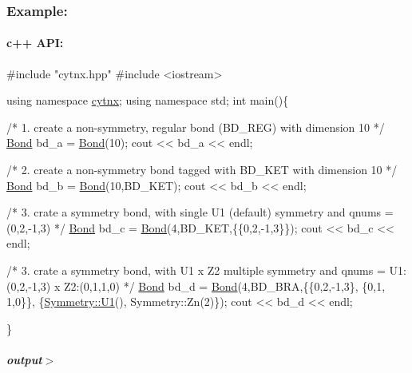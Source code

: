 \subsubsection*{Example\+:}

\paragraph*{c++ A\+PI\+:}


\begin{DoxyCodeInclude}
\textcolor{preprocessor}{#include "cytnx.hpp"}
\textcolor{preprocessor}{#include <iostream>}


\textcolor{keyword}{using namespace }\hyperlink{namespacecytnx}{cytnx};
\textcolor{keyword}{using namespace }std;
\textcolor{keywordtype}{int} main()\{ 

    \textcolor{comment}{/* 1.}
\textcolor{comment}{        create a non-symmetry, regular bond (BD\_REG) }
\textcolor{comment}{        with dimension 10}
\textcolor{comment}{    */}
    \hyperlink{classcytnx_1_1Bond}{Bond} bd\_a = \hyperlink{classcytnx_1_1Bond}{Bond}(10);
    cout << bd\_a << endl;

    \textcolor{comment}{/* 2. }
\textcolor{comment}{        create a non-symmetry bond tagged with BD\_KET }
\textcolor{comment}{        with dimension 10}
\textcolor{comment}{    */}
    \hyperlink{classcytnx_1_1Bond}{Bond} bd\_b = \hyperlink{classcytnx_1_1Bond}{Bond}(10,BD\_KET);
    cout << bd\_b << endl;

    \textcolor{comment}{/* 3.}
\textcolor{comment}{        crate a symmetry bond, }
\textcolor{comment}{        with single U1 (default) symmetry and qnums = (0,2,-1,3)}
\textcolor{comment}{    */}
    \hyperlink{classcytnx_1_1Bond}{Bond} bd\_c = \hyperlink{classcytnx_1_1Bond}{Bond}(4,BD\_KET,\{\{0,2,-1,3\}\});
    cout << bd\_c << endl;

    \textcolor{comment}{/* 3.}
\textcolor{comment}{        crate a symmetry bond, }
\textcolor{comment}{        with U1 x Z2 multiple symmetry }
\textcolor{comment}{        and qnums = U1:(0,2,-1,3) x Z2:(0,1,1,0)}
\textcolor{comment}{    */}
    \hyperlink{classcytnx_1_1Bond}{Bond} bd\_d = \hyperlink{classcytnx_1_1Bond}{Bond}(4,BD\_BRA,\{\{0,2,-1,3\},
                               \{0,1, 1,0\}\},
                              \{\hyperlink{classcytnx_1_1Symmetry_a9218fd66fc9cca64cd3d792e0019592a}{Symmetry::U1}(),
                               Symmetry::Zn(2)\});
    cout << bd\_d << endl;

    
    


\}

\end{DoxyCodeInclude}
 \subparagraph*{output$>$}


